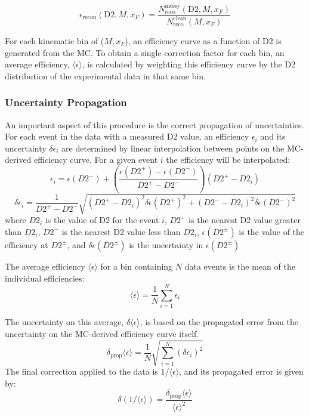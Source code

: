 \documentclass[11pt]{article}
\begin{document}
\begin{equation}
    \epsilon_{\text{recon}}(\text{D2}, M, x_F) = \frac{N_{\text{reco}}^{\text{messy}}(\text{D2}, M, x_F)}{N_{\text{reco}}^{\text{clean}}(M, x_F)}
\end{equation}

For each kinematic bin of ($M, x_F$), an efficiency curve as a function of D2 is generated from the MC. To obtain a single correction factor for each bin, an average efficiency, $\langle \epsilon \rangle$, is calculated by weighting this efficiency curve by the D2 distribution of the experimental data in that same bin.

\subsubsection{Uncertainty Propagation}
An important aspect of this procedure is the correct propagation of uncertainties. For each event in the data with a measured D2 value, an efficiency $\epsilon_{i}$ and its uncertainty $\delta\epsilon_{i}$ are determined by linear interpolation between points on the MC-derived efficiency curve.  For a given event $i$ the efficiency will be interpolated:
$$\epsilon_i = \epsilon(D2^-)+\left(\frac{\epsilon(D2^+)-\epsilon(D2^-)}{D2^+-D2^-} \right)\left(D2^+-D2_i\right) $$
$$\delta\epsilon_i = \frac{1}{D2^+-D2^-}\sqrt{\left(D2^+-D2_i\right)^2\delta\epsilon(D2^+)^2+\left(D2^--D2_i\right)^2\delta\epsilon(D2^-)^2}$$
where $D2_i$ is the value of D2 for the event $i$, $D2^+$ is the nearest D2 value greater than $D2_i$, $D2^-$ is the nearest D2 value less than $D2_i$, $\epsilon(D2^\pm)$ is the value of the efficiency at $D2^\pm$, and $\delta\epsilon(D2^\pm)$ is the uncertainty in $\epsilon(D2^\pm)$

The average efficiency $\langle\epsilon\rangle$ for a bin containing $N$ data events is the mean of the individual efficiencies:
\begin{equation} \label{eq:avg_eff_2}
    \langle\epsilon\rangle = \frac{1}{N} \sum_{i=1}^{N} \epsilon_i
\end{equation}

The uncertainty on this average, $\delta\langle\epsilon\rangle$, is based on the propagated error from the uncertainty on the MC-derived efficiency curve itself. 
\begin{equation} \label{eq:prop_err_2}
    \delta_{\text{prop}} \langle\epsilon\rangle = \frac{1}{N} \sqrt{\sum_{i=1}^{N} (\delta\epsilon_i)^2}
\end{equation}
The final correction applied to the data is $1/\langle\epsilon\rangle$, and its propagated error is given by:
\begin{equation} \label{eq:inv_err_2}
    \delta(1/\langle\epsilon\rangle) = \frac{\delta_{\text{prop}}\langle\epsilon\rangle}{\langle\epsilon\rangle^2}
\end{equation}
\end{document}
